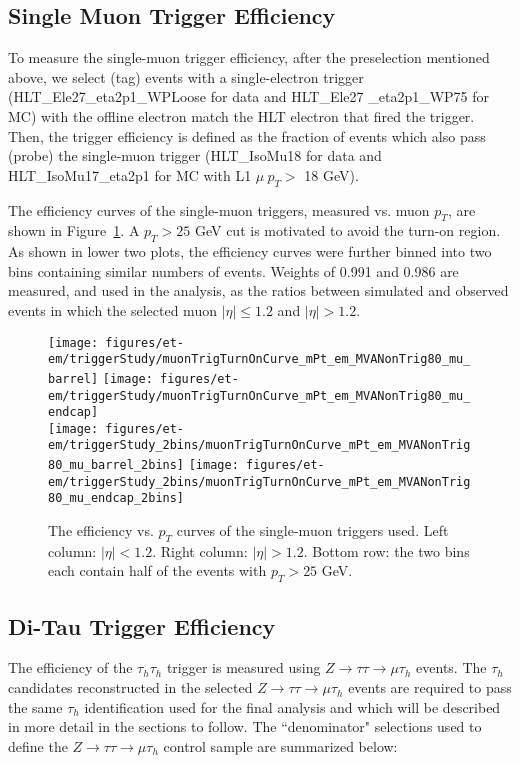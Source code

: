 \subsection{Single Muon Trigger Efficiency}\label{sec:muTrigger}
To measure the single-muon trigger efficiency, after the preselection
mentioned above, we select (tag) events with a single-electron trigger
 (HLT\_Ele27\_eta2p1\_WPLoose for data and HLT\_Ele27 \_eta2p1\_WP75 for MC) 
with the offline electron match the HLT electron that fired the trigger.
Then, the trigger efficiency is defined as the fraction of events
which also pass (probe) the single-muon trigger 
(HLT\_IsoMu18 for data and HLT\_IsoMu17\_eta2p1 for MC with L1 $\mu~p_T > $ 18 GeV).

The efficiency curves of the single-muon triggers, measured vs. muon
$p_{T}$, are shown in Figure~\ref{fig:muturnon}. A $p_{T} > 25$ GeV cut is
motivated to avoid the turn-on region. As shown in lower two plots,
the efficiency curves were further binned into two bins containing
similar numbers of events.  Weights of 0.991 and 0.986 are measured,
and used in the analysis, as the ratios between simulated and observed
events in which the selected muon $|\eta| \leq 1.2$ and $|\eta|>1.2$.
\begin{figure}\centering
  \texttt{[image: figures/et-em/triggerStudy/muonTrigTurnOnCurve\_mPt\_em\_MVANonTrig80\_mu\_barrel]}
  \texttt{[image: figures/et-em/triggerStudy/muonTrigTurnOnCurve\_mPt\_em\_MVANonTrig80\_mu\_endcap]} \\
  \texttt{[image: figures/et-em/triggerStudy\_2bins/muonTrigTurnOnCurve\_mPt\_em\_MVANonTrig80\_mu\_barrel\_2bins]}
  \texttt{[image: figures/et-em/triggerStudy\_2bins/muonTrigTurnOnCurve\_mPt\_em\_MVANonTrig80\_mu\_endcap\_2bins]} \\
  \caption{\label{fig:muturnon} The efficiency vs. $p_{T}$ curves of the
    single-muon triggers used.  Left column: $|\eta|<1.2$.  Right
    column: $|\eta|>1.2$.  Bottom row: the two bins each contain half
    of the events with $p_{T} > 25$ GeV.}
\end{figure}

\subsection{Di-Tau Trigger Efficiency}\label{sec:tauTrigger}

The efficiency of the $\tau_{h}\tau_{h}$ trigger is measured using 
$Z\to\tau\tau\to\mu\tau_{h}$ events.  The $\tau_{h}$ candidates 
reconstructed in the selected $Z\to\tau\tau\to\mu\tau_{h}$ events are 
required to pass the same $\tau_{h}$ identification used for the final
analysis and which will be described in more detail in the sections to follow. The 
``denominator" selections used to define the $Z\to\tau\tau\to\mu\tau_{h}$ control sample 
are summarized below:

